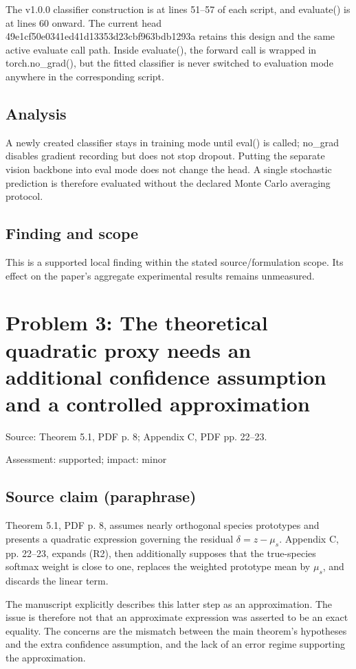 \documentclass[11pt]{article}
\begin{document}
The v1.0.0 classifier construction is at lines 51–57 of each script, and evaluate() is at lines 60 onward. The current head 49e1cf50e0341ed41d13353d23cbf963bdb1293a retains this design and the same active evaluate call path. Inside evaluate(), the forward call is wrapped in torch.no\_grad(), but the fitted classifier is never switched to evaluation mode anywhere in the corresponding script.

\subsection*{Analysis}

A newly created classifier stays in training mode until eval() is called; no\_grad disables gradient recording but does not stop dropout. Putting the separate vision backbone into eval mode does not change the head. A single stochastic prediction is therefore evaluated without the declared Monte Carlo averaging protocol.

\subsection*{Finding and scope}

This is a supported local finding within the stated source/formulation scope. Its effect on the paper's aggregate experimental results remains unmeasured.

\section*{Problem 3: The theoretical quadratic proxy needs an additional confidence assumption and a controlled approximation}

Source: Theorem 5.1, PDF p. 8; Appendix C, PDF pp. 22–23.

Assessment: supported; impact: minor

\subsection*{Source claim (paraphrase)}

Theorem 5.1, PDF p. 8, assumes nearly orthogonal species prototypes and presents a quadratic expression governing the residual \(\delta=z-\mu_s\). Appendix C, pp. 22–23, expands (R2), then additionally supposes that the true-species softmax weight is close to one, replaces the weighted prototype mean by \(\mu_s\), and discards the linear term.

The manuscript explicitly describes this latter step as an approximation. The issue is therefore not that an approximate expression was asserted to be an exact equality. The concerns are the mismatch between the main theorem’s hypotheses and the extra confidence assumption, and the lack of an error regime supporting the approximation.
\end{document}
